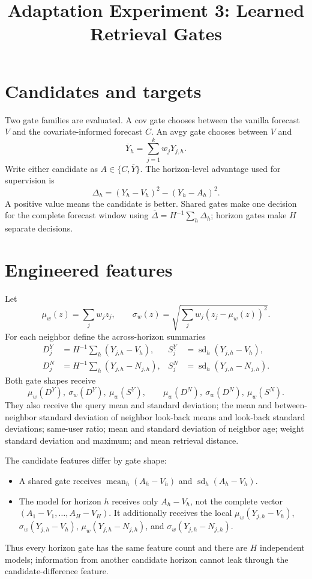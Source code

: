 \documentclass[10pt]{article}
\title{Adaptation Experiment 3: Learned Retrieval Gates}
\author{}
\date{}
\begin{document}
\maketitle

\section{Candidates and targets}
Two gate families are evaluated. A cov gate chooses between the vanilla
forecast $V$ and the covariate-informed forecast $C$. An avgy
gate chooses between $V$ and
\[
 \overline Y_h=\sum_{j=1}^{k}w_jY_{j,h}.
\]
Write either candidate as $A\in\{C,\overline Y\}$. The horizon-level advantage
used for supervision is
\[
 \Delta_h=(Y_h-V_h)^2-(Y_h-A_h)^2.
\]
A positive value means the candidate is better. Shared gates make one decision
for the complete forecast window using $\overline\Delta=H^{-1}\sum_h\Delta_h$;
horizon gates make $H$ separate decisions.


\section{Engineered features}
Let
\[
 \mu_w(z)=\sum_jw_jz_j,\qquad
 \sigma_w(z)=\sqrt{\sum_jw_j(z_j-\mu_w(z))^2}.
\]
For each neighbor define the across-horizon summaries
\[
\begin{aligned}
 D^Y_j&=H^{-1}\sum_h(Y_{j,h}-V_h),
 &S^Y_j&=\operatorname{sd}_h(Y_{j,h}-V_h),\\
 D^N_j&=H^{-1}\sum_h(Y_{j,h}-N_{j,h}),
 &S^N_j&=\operatorname{sd}_h(Y_{j,h}-N_{j,h}).
\end{aligned}
\]
Both gate shapes receive
\[
 \mu_w(D^Y),\ \sigma_w(D^Y),\ \mu_w(S^Y),\qquad
 \mu_w(D^N),\ \sigma_w(D^N),\ \mu_w(S^N).
\]
They also receive the query mean and standard deviation; the mean and
between-neighbor standard deviation of neighbor look-back means and
look-back standard deviations; same-user ratio; mean and standard deviation of
neighbor age; weight standard deviation and maximum; and mean retrieval
distance.

The candidate features differ by gate shape:
\begin{itemize}
\item A shared gate receives
$\operatorname{mean}_h(A_h-V_h)$ and
$\operatorname{sd}_h(A_h-V_h)$.
\item The model for horizon $h$ receives only $A_h-V_h$, not the complete
vector $(A_1-V_1,\ldots,A_H-V_H)$. It additionally receives the local
$\mu_w(Y_{j,h}-V_h)$, $\sigma_w(Y_{j,h}-V_h)$,
$\mu_w(Y_{j,h}-N_{j,h})$, and $\sigma_w(Y_{j,h}-N_{j,h})$.
\end{itemize}
Thus every horizon gate has the same feature count and there are $H$
independent models; information from another candidate horizon cannot leak
through the candidate-difference feature.
\end{document}
